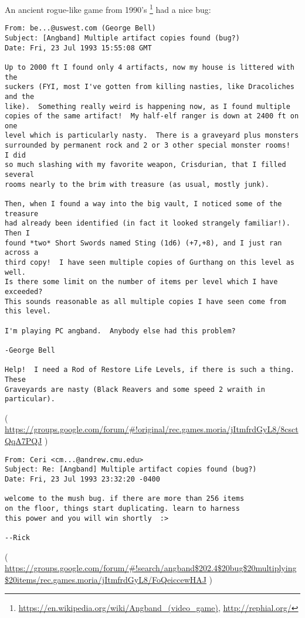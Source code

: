 \label{Angband}

An ancient rogue-like game from 1990's
\footnote{\url{https://en.wikipedia.org/wiki/Angband_(video_game)}, \url{http://rephial.org/}} had a nice bug:

\begin{lstlisting}
From: be...@uswest.com (George Bell)
Subject: [Angband] Multiple artifact copies found (bug?)
Date: Fri, 23 Jul 1993 15:55:08 GMT

Up to 2000 ft I found only 4 artifacts, now my house is littered with the
suckers (FYI, most I've gotten from killing nasties, like Dracoliches and the
like).  Something really weird is happening now, as I found multiple
copies of the same artifact!  My half-elf ranger is down at 2400 ft on one
level which is particularly nasty.  There is a graveyard plus monsters
surrounded by permanent rock and 2 or 3 other special monster rooms!  I did
so much slashing with my favorite weapon, Crisdurian, that I filled several
rooms nearly to the brim with treasure (as usual, mostly junk).

Then, when I found a way into the big vault, I noticed some of the treasure
had already been identified (in fact it looked strangely familiar!).  Then I
found *two* Short Swords named Sting (1d6) (+7,+8), and I just ran across a
third copy!  I have seen multiple copies of Gurthang on this level as well.
Is there some limit on the number of items per level which I have exceeded?
This sounds reasonable as all multiple copies I have seen come from this level.

I'm playing PC angband.  Anybody else had this problem?

-George Bell

Help!  I need a Rod of Restore Life Levels, if there is such a thing.  These
Graveyards are nasty (Black Reavers and some speed 2 wraith in particular). 
\end{lstlisting}
( \url{https://groups.google.com/forum/#!original/rec.games.moria/jItmfrdGyL8/8csctQqA7PQJ} )

\begin{lstlisting}
From: Ceri <cm...@andrew.cmu.edu>
Subject: Re: [Angband] Multiple artifact copies found (bug?)
Date: Fri, 23 Jul 1993 23:32:20 -0400

welcome to the mush bug. if there are more than 256 items
on the floor, things start duplicating. learn to harness
this power and you will win shortly  :>

--Rick
\end{lstlisting}
( \url{https://groups.google.com/forum/#!search/angband$202.4$20bug$20multiplying$20items/rec.games.moria/jItmfrdGyL8/FoQeiccewHAJ} )

